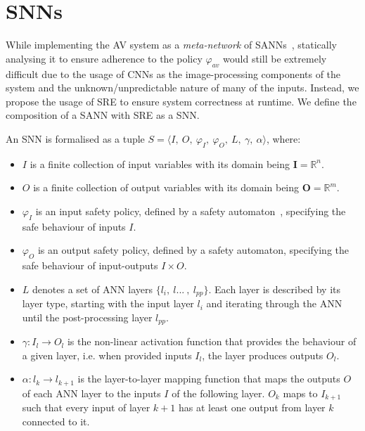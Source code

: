 \section{\acfp{SNN}}
\label{sec:definitions}

While implementing the \ac{AV} system as a \textit{meta-network} of \acp{SANN}~\cite{sann}, statically analysing it to ensure adherence to the policy $\varphi_{av}$ would still be extremely difficult due to the usage of \acp{CNN} as the image-processing components of the system and the unknown/unpredictable nature of many of the inputs.
Instead, we propose the usage of \ac{SRE} to ensure system correctness at runtime.
We define the composition of a \ac{SANN} with \ac{SRE} as a \ac{SNN}.

\begin{definition}
	\label{def:ssann}
	An \ac{SNN} is formalised as a tuple $S = \langle I,~O,~\varphi_I,~\varphi_O,~L,~\gamma,~\alpha  \rangle$, where:
	\begin{itemize}
		\item $I$ is a finite collection of input variables with
		its domain being $\mathbf{I} = \mathbb{R}^n$.
		\item  $O$ is a finite collection of  output variables with
		its domain being $\mathbf{O} = \mathbb{R}^m$.
		\item $\varphi_I$ is an input safety policy, defined by a safety automaton~\cite{recps}, specifying the safe behaviour of inputs $I$.
		\item $\varphi_O$ is an output safety policy, defined by a safety automaton, specifying the safe behaviour of input-outputs $I \times O$.
		\item $L$ denotes a set of \ac{ANN} layers $\{l_i,~l...~,~l_{pp}\}$. Each layer is described by its layer type, starting with the input layer $l_i$ and iterating through the \ac{ANN} until the post-processing layer $l_{pp}$.
		\item $\gamma: I_l \rightarrow O_l$ is the non-linear activation function that provides the behaviour of a given layer, i.e. when provided inputs $I_l$, the layer produces outputs $O_l$.
		\item $\alpha: l_k \rightarrow l_{k+1}$ is the layer-to-layer mapping function that maps the outputs $O$ of each \ac{ANN} layer to the inputs  $I$ of the following layer. $O_k$ maps to $I_{k+1}$ such that every input of layer $k+1$ has at least one output from layer $k$ connected to it. 
	\end{itemize}
\end{definition} 

